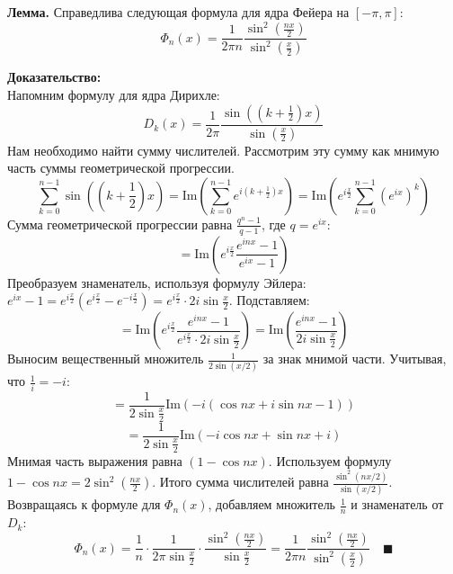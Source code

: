 \documentclass[12pt,a4paper,openany]{book}
\begin{document}
\textbf{Лемма.} Справедлива следующая формула для ядра Фейера на $[-\pi, \pi]$:
\begin{equation}
    \Phi_n(x) = \frac{1}{2\pi n} \frac{\sin^2\left(\frac{nx}{2}\right)}{\sin^2\left(\frac{x}{2}\right)}
\end{equation}

\textbf{Доказательство:} \\
Напомним формулу для ядра Дирихле:
$$ D_k(x) = \frac{1}{2\pi} \frac{\sin\left((k+\frac{1}{2})x\right)}{\sin\left(\frac{x}{2}\right)} $$
Нам необходимо найти сумму числителей. Рассмотрим эту сумму как мнимую часть суммы геометрической прогрессии.
$$ \sum_{k=0}^{n-1} \sin\left((k+\frac{1}{2})x\right) = \text{Im} \left( \sum_{k=0}^{n-1} e^{i(k+\frac{1}{2})x} \right) = \text{Im} \left( e^{i\frac{x}{2}} \sum_{k=0}^{n-1} (e^{ix})^k \right) $$
Сумма геометрической прогрессии равна $\frac{q^n - 1}{q - 1}$, где $q = e^{ix}$:
$$ = \text{Im} \left( e^{i\frac{x}{2}} \frac{e^{inx} - 1}{e^{ix} - 1} \right) $$
Преобразуем знаменатель, используя формулу Эйлера: $e^{ix} - 1 = e^{i\frac{x}{2}}(e^{i\frac{x}{2}} - e^{-i\frac{x}{2}}) = e^{i\frac{x}{2}} \cdot 2i \sin\frac{x}{2}$.
Подставляем:
$$ = \text{Im} \left( e^{i\frac{x}{2}} \frac{e^{inx} - 1}{e^{i\frac{x}{2}} \cdot 2i \sin\frac{x}{2}} \right) = \text{Im} \left( \frac{e^{inx} - 1}{2i \sin\frac{x}{2}} \right) $$
Выносим вещественный множитель $\frac{1}{2\sin(x/2)}$ за знак мнимой части. Учитывая, что $\frac{1}{i} = -i$:
$$ = \frac{1}{2\sin\frac{x}{2}} \text{Im} \left( -i (\cos nx + i\sin nx - 1) \right) $$
$$ = \frac{1}{2\sin\frac{x}{2}} \text{Im} \left( -i \cos nx + \sin nx + i \right) $$
Мнимая часть выражения равна $(1 - \cos nx)$. Используем формулу $1 - \cos nx = 2\sin^2\left(\frac{nx}{2}\right)$.
Итого сумма числителей равна $\frac{\sin^2(nx/2)}{\sin(x/2)}$.
Возвращаясь к формуле для $\Phi_n(x)$, добавляем множитель $\frac{1}{n}$ и знаменатель от $D_k$:
$$ \Phi_n(x) = \frac{1}{n} \cdot \frac{1}{2\pi \sin\frac{x}{2}} \cdot \frac{\sin^2\left(\frac{nx}{2}\right)}{\sin\frac{x}{2}} = \frac{1}{2\pi n} \frac{\sin^2\left(\frac{nx}{2}\right)}{\sin^2\left(\frac{x}{2}\right)} \quad \blacksquare $$

\begin{center}
\end{center}
\end{document}
